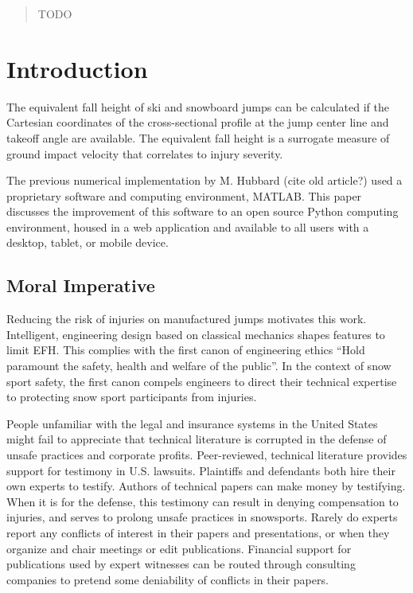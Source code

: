 \documentclass{article}
\begin{document}
\begin{abstract}
    TODO
\end{abstract}

\section{Introduction}
%
The equivalent fall height of ski and snowboard jumps can be calculated if the
Cartesian coordinates of the cross-sectional profile at the jump center line
and takeoff angle are available. The equivalent fall height is a surrogate
measure of ground impact velocity that correlates to injury severity.

The previous numerical implementation by M. Hubbard (cite old article?) used a
proprietary software and computing environment, MATLAB. This paper discusses
the improvement of this software to an open source Python computing
environment, housed in a web application and available to all users with a
desktop, tablet, or mobile device.

\subsection{Moral Imperative}
%
Reducing the risk of injuries on manufactured jumps motivates this work.
Intelligent, engineering design based on classical mechanics shapes features to
limit EFH. This complies with the first canon of engineering ethics ``Hold
paramount the safety, health and welfare of the public''. In the context of
snow sport safety, the first canon compels engineers to direct their technical
expertise to protecting snow sport participants from injuries.

People unfamiliar with the legal and insurance systems in the United States
might fail to appreciate that technical literature is corrupted in the defense
of unsafe practices and corporate profits. Peer-reviewed, technical literature
provides support for testimony in U.S. lawsuits. Plaintiffs and defendants both
hire their own experts to testify. Authors of technical papers can make money
by testifying. When it is for the defense, this testimony can result in denying
compensation to injuries, and serves to prolong unsafe practices in snowsports.
Rarely do experts report any conflicts of interest in their papers and
presentations, or when they organize and chair meetings or edit publications.
Financial support for publications used by expert witnesses can be routed
through consulting companies to pretend some deniability of conflicts in their
papers.
\end{document}

